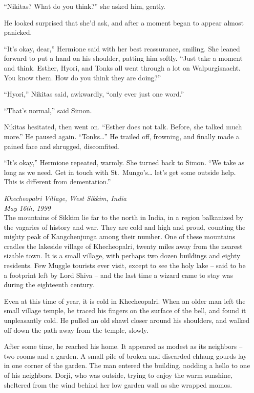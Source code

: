 ``Nikitas? What do you think?'' she asked him, gently.

He looked surprised that she'd ask, and after a moment began to appear
almost panicked.

``It's okay, dear,'' Hermione said with her best reassurance, smiling.
She leaned forward to put a hand on his shoulder, patting him softly.
``Just take a moment and think. Esther, Hyori, and Tonks all went
through a lot on Walpurgisnacht. You know them. How do you think they
are doing?''

``Hyori,'' Nikitas said, awkwardly, ``only ever just one word.''

``That's normal,'' said Simon.

Nikitas hesitated, then went on. ``Esther does not talk. Before, she
talked much more.'' He paused again. ``Tonks\ldots{}'' He trailed off,
frowning, and finally made a pained face and shrugged, discomfited.

``It's okay,'' Hermione repeated, warmly. She turned back to Simon. ``We
take as long as we need. Get in touch with St.~Mungo's\ldots{} let's get
some outside help. This is different from dementation.''

\mybreak

\emph{Khecheopalri Village, West Sikkim, India}\\
\emph{May 16th, 1999}\\

The mountains of Sikkim lie far to the north in India, in a region
balkanized by the vagaries of history and war. They are cold and high
and proud, counting the mighty peak of Kangchenjunga among their number.
One of these mountains cradles the lakeside village of Khecheopalri,
twenty miles away from the nearest sizable town. It is a small village,
with perhaps two dozen buildings and eighty residents. Few Muggle
tourists ever visit, except to see the holy lake -- said to be a
footprint left by Lord Shiva -- and the last time a wizard came to stay
was during the eighteenth century.

Even at this time of year, it is cold in Khecheopalri. When an older man
left the small village temple, he traced his fingers on the surface of
the bell, and found it unpleasantly cold. He pulled an old shawl closer
around his shoulders, and walked off down the path away from the temple,
slowly.

After some time, he reached his home. It appeared as modest as its
neighbors -- two rooms and a garden. A small pile of broken and
discarded chhang gourds lay in one corner of the garden. The man entered
the building, nodding a hello to one of his neighbors, Dorji, who was
outside, trying to enjoy the warm sunshine, sheltered from the wind
behind her low garden wall as she wrapped momos.

